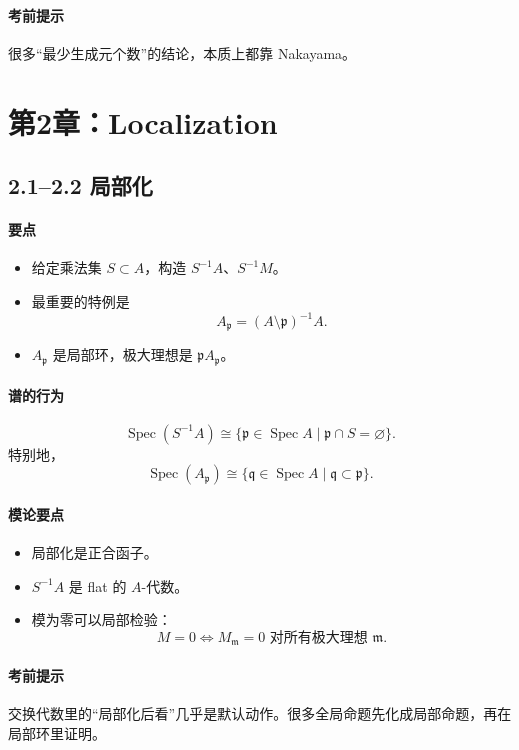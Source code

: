 \documentclass[a4paper]{ctexart}
\begin{document}
\paragraph{考前提示}
很多“最少生成元个数”的结论，本质上都靠 Nakayama。

\section{第2章：Localization}

\subsection{2.1--2.2 局部化}

\paragraph{要点}
\begin{itemize}
  \item 给定乘法集 \(S\subset A\)，构造 \(S^{-1}A\)、\(S^{-1}M\)。
  \item 最重要的特例是
  \[
    A_{\mathfrak p}=(A\setminus \mathfrak p)^{-1}A.
  \]
  \item \(A_{\mathfrak p}\) 是局部环，极大理想是 \(\mathfrak pA_{\mathfrak p}\)。
\end{itemize}

\paragraph{谱的行为}
\[
\operatorname{Spec}(S^{-1}A)\cong \{\mathfrak p\in \operatorname{Spec}A\mid \mathfrak p\cap S=\varnothing\}.
\]
特别地，
\[
\operatorname{Spec}(A_{\mathfrak p})\cong \{\mathfrak q\in \operatorname{Spec}A\mid \mathfrak q\subset \mathfrak p\}.
\]

\paragraph{模论要点}
\begin{itemize}
  \item 局部化是正合函子。
  \item \(S^{-1}A\) 是 flat 的 \(A\)-代数。
  \item 模为零可以局部检验：
  \[
    M=0 \Longleftrightarrow M_{\mathfrak m}=0 \text{ 对所有极大理想 } \mathfrak m.
  \]
\end{itemize}

\paragraph{考前提示}
交换代数里的“局部化后看”几乎是默认动作。很多全局命题先化成局部命题，再在局部环里证明。
\end{document}
